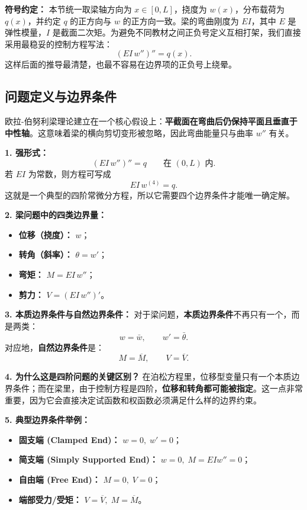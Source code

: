 \documentclass[11pt, a4paper, UTF8]{ctexart}
\begin{document}
\textbf{符号约定：}
本节统一取梁轴方向为 $x\in[0,L]$，挠度为 $w(x)$，分布载荷为 $q(x)$，并约定 $q$ 的正方向与 $w$ 的正方向一致。梁的弯曲刚度为 $EI$，其中 $E$ 是弹性模量，$I$ 是截面二次矩。为避免不同教材之间正负号定义互相打架，我们直接采用最稳妥的控制方程写法：
\[
(EI\, w'')'' = q(x).
\]
这样后面的推导最清楚，也最不容易在边界项的正负号上绕晕。

\subsection{问题定义与边界条件}
欧拉-伯努利梁理论建立在一个核心假设上：\textbf{平截面在弯曲后仍保持平面且垂直于中性轴}。这意味着梁的横向剪切变形被忽略，因此弯曲能量只与曲率 $w''$ 有关。

\textbf{1. 强形式：}
\[
(EI\, w'')'' = q \qquad \text{在 } (0,L) \text{ 内}.
\]
若 $EI$ 为常数，则方程可写成
\[
EI\, w^{(4)} = q.
\]
这就是一个典型的四阶常微分方程，所以它需要四个边界条件才能唯一确定解。

\textbf{2. 梁问题中的四类边界量：}
\begin{itemize}
    \item \textbf{位移（挠度）：} $w$；
    \item \textbf{转角（斜率）：} $\theta = w'$；
    \item \textbf{弯矩：} $M = EI\, w''$；
    \item \textbf{剪力：} $V = (EI\, w'')'$。
\end{itemize}

\textbf{3. 本质边界条件与自然边界条件：}
对于梁问题，\textbf{本质边界条件}不再只有一个，而是两类：
\[
w = \bar{w}, \qquad w' = \bar{\theta}.
\]
对应地，\textbf{自然边界条件}是：
\[
M = \overline{M}, \qquad V = \overline{V}.
\]

\textbf{4. 为什么这是四阶问题的关键区别？}
在泊松方程里，位移型变量只有一个本质边界条件；而在梁里，由于控制方程是四阶，\textbf{位移和转角都可能被指定}。这一点非常重要，因为它会直接决定试函数和权函数必须满足什么样的边界约束。

\textbf{5. 典型边界条件举例：}
\begin{itemize}
    \item \textbf{固支端 (Clamped End)：} $w=0,\; w'=0$；
    \item \textbf{简支端 (Simply Supported End)：} $w=0,\; M=EI w''=0$；
    \item \textbf{自由端 (Free End)：} $M=0,\; V=0$；
    \item \textbf{端部受力/受矩：} $V=\overline{V},\; M=\overline{M}$。
\end{itemize}
\end{document}

